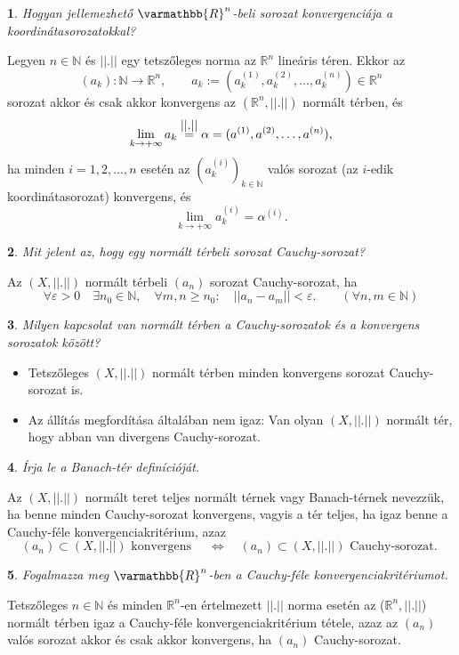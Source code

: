 \documentclass[a4paper]{article}
\def\R{\mathbb{R}}
\def\N{\mathbb{N}}
\def\RR{\varmathbb{R}}
\theoremstyle{qstyle}
\newtheorem{question}{}{}
\begin{document}
	\begin{question}
		Hogyan jellemezhető $\RR^n$-beli sorozat konvergenciája a koordinátasorozatokkal?   
	\end{question}
	Legyen $n \in \N$ és $||.||$ egy tetszőleges norma az $\R^{n}$ lineáris téren. Ekkor az
	$$(a_{k}) : \N \to \R^{n}, \quad\quad a_{k} := (a_{k}^{(1)}, a_{k}^{(2)}, \dots, a_{k}^{(n)}) \in \R^{n}$$
	sorozat akkor és csak akkor konvergens az $(\R^{n}, ||.||)$ normált térben, és
	$$\lim\limits_{k \to +\infty} a_{k} \stackrel{\hbox{$||.||$}}{\hbox{=}} \alpha = (a^{(1)}, a^{(2)},\dots,a^{(n)})\text{,}$$
	ha minden $i=1,2,\dots,n$ esetén az $(a_{k}^{(i)})_{k \in \N}$ valós sorozat (az $i$-edik koordinátasorozat) konvergens, és
	$$\lim\limits_{k \to +\infty} a_{k}^{(i)} = \alpha^{(i)}\text{.}$$
	
	\begin{question}
		Mit jelent az, hogy egy normált térbeli sorozat Cauchy-sorozat?   
	\end{question}
	Az $(X, ||.||)$ normált térbeli $(a_{n})$ sorozat Cauchy-sorozat, ha
	$$\forall \varepsilon > 0 \quad \exists n_{0} \in \N, \quad \forall m,n \ge n_{0} : \quad ||a_{n} - a_{m}|| < \varepsilon \text{.} \quad\quad (\forall n,m \in \N)$$
	
	\begin{question}
		Milyen kapcsolat van normált térben a Cauchy-sorozatok és a konvergens sorozatok között?   
	\end{question}
	\begin{itemize}
		\item Tetszőleges $(X, ||.||)$ normált térben minden konvergens sorozat Cauchy-sorozat is.
		\item Az állítás megfordítása általában nem igaz: Van olyan $(X, ||.||)$ normált tér, hogy abban van divergens Cauchy-sorozat. 
	\end{itemize}
	
	\begin{question}
		Írja le a Banach-tér definícióját.   
	\end{question}
	Az $(X, ||.||)$ normált teret teljes normált térnek vagy Banach-térnek nevezzük, ha benne minden Cauchy-sorozat konvergens, vagyis a tér teljes, ha igaz benne a Cauchy-féle konvergenciakritérium, azaz
	$$(a_{n}) \subset (X, ||.||) \text{ konvergens } \quad \Longleftrightarrow \quad (a_{n}) \subset (X, ||.||) \text{ Cauchy-sorozat. }$$
	
	\newpage
	
	\begin{question}
		Fogalmazza meg $\RR^n$-ben a Cauchy-féle konvergenciakritériumot.  
	\end{question}
	Tetszőleges $n \in \N$ és minden $\R^n$-en értelmezett $||.||$ norma esetén az ($\R^{n}, ||.||$) normált térben igaz a Cauchy-féle konvergenciakritérium tétele, azaz az $(a_{n})$ valós sorozat akkor és csak akkor konvergens, ha $(a_{n})$ Cauchy-sorozat.
	
\end{document}
